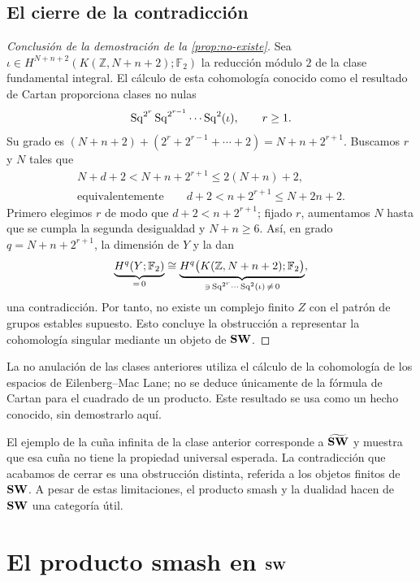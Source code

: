 \subsection{El cierre de la contradicción}

\begin{proof}[Conclusión de la demostración de la \cref{prop:no-existe}]
Sea $\iota\in H^{N+n+2}(K(\mathbb Z,N+n+2);\mathbb F_2)$ la reducción módulo $2$ de la clase fundamental integral. El cálculo de esta cohomología conocido como el resultado de Cartan proporciona clases no nulas
\[
\operatorname{Sq}^{2^r}\operatorname{Sq}^{2^{r-1}}\cdots\operatorname{Sq}^2(\iota),\qquad r\ge1.
\]
Su grado es $(N+n+2)+(2^r+2^{r-1}+\cdots+2)=N+n+2^{r+1}$. Buscamos $r$ y $N$ tales que
\[
\begin{gathered}
N+d+2<N+n+2^{r+1}\le2(N+n)+2,\\
\text{equivalentemente}\qquad d+2<n+2^{r+1}\le N+2n+2.
\end{gathered}
\]
Primero elegimos $r$ de modo que $d+2<n+2^{r+1}$; fijado $r$, aumentamos $N$ hasta que se cumpla la segunda desigualdad y $N+n\ge6$. Así, en grado $q=N+n+2^{r+1}$, la dimensión de $Y$ y la  dan
\[
\underbrace{H^q(Y;\mathbb F_2)}_{=\,0}
\cong
\underbrace{H^q\bigl(K(\mathbb Z,N+n+2);\mathbb F_2\bigr)}_{\ni\,\operatorname{Sq}^{2^r}\cdots\operatorname{Sq}^2(\iota)\,\ne\,0},
\]
una contradicción. Por tanto, no existe un complejo finito $Z$ con el patrón de grupos estables supuesto. Esto concluye la obstrucción a representar la cohomología singular mediante un objeto de $\mathbf{SW}$.
\end{proof}

\begin{nota}
La no anulación de las clases anteriores utiliza el cálculo de la cohomología de los espacios de Eilenberg--Mac Lane; no se deduce únicamente de la fórmula de Cartan para el cuadrado de un producto. Este resultado se usa como un hecho conocido, sin demostrarlo aquí.
\end{nota}

El ejemplo de la cuña infinita de la clase anterior corresponde a $\widetilde{\mathbf{SW}}$ y muestra que esa cuña no tiene la propiedad universal esperada. La contradicción que acabamos de cerrar es una obstrucción distinta, referida a los objetos finitos de $\mathbf{SW}$. A pesar de estas limitaciones, el producto smash y la dualidad hacen de $\mathbf{SW}$ una categoría útil.

\section{El producto smash en \texorpdfstring{$\mathbf{SW}$}{SW}}

